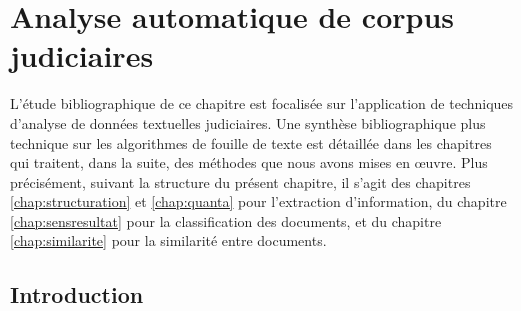 \chapter{Analyse automatique de corpus judiciaires}
\label{chap:literature}


L'étude bibliographique de ce chapitre est focalisée sur l'application de techniques d'analyse de données textuelles judiciaires. Une synthèse bibliographique plus technique sur les algorithmes de fouille de texte est détaillée dans les chapitres qui traitent, dans la suite, des méthodes que nous avons mises en \oe{}uvre. Plus précisément, suivant la structure du présent chapitre,  il s'agit des chapitres \ref{chap:structuration} et \ref{chap:quanta} pour l'extraction d'information, du chapitre \ref{chap:sensresultat} pour la classification des documents, et du chapitre \ref{chap:similarite} pour la similarité entre documents.

\section{Introduction}

